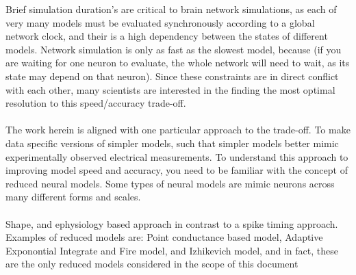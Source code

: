 \documentclass{report}
\begin{document}
\begin{itemize}
Brief simulation duration's are critical to brain network simulations, as each of very many models must be evaluated synchronously according to a global network clock, and their is a high dependency between the states of different models. Network simulation is only as fast as the slowest model, because (if you are waiting for one neuron to evaluate, the whole network will need to wait, as its state may depend on that neuron). Since these constraints are in direct conflict with each other, many scientists are interested in the finding the most optimal resolution to this speed/accuracy trade-off.\\ 
\\
The work herein is aligned with one particular approach to the trade-off. To make data specific versions of simpler models, such that simpler models better mimic experimentally observed electrical measurements. To understand this approach to improving model speed and accuracy, you need to be familiar with the concept of reduced neural models. Some types of neural models are mimic neurons across many different forms and scales.\\
\\
Shape, and ephysiology based approach in contrast to a spike timing approach. 
\\
Examples of reduced models are:
Point conductance based model, Adaptive Exponontial Integrate and Fire model, and Izhikevich model, and in fact, these are the only reduced models considered in the scope of this document\\

\end{itemize}
\end{document}
